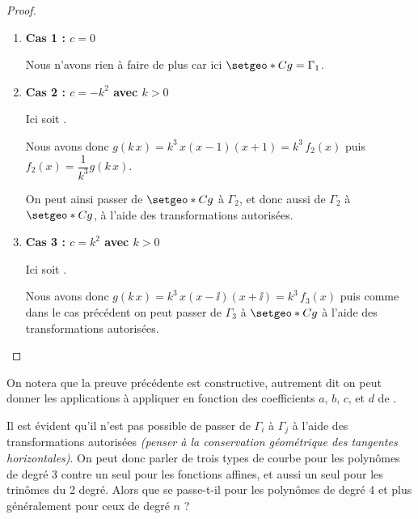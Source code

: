 \begin{proof}
\begin{enumerate}


		\item \textbf{Cas 1 : $c = 0$}

		      \smallskip

		      \noindent
		      Nous n'avons rien à faire de plus car ici $\setgeo*{C}{g} = \Gamma_1$.




		\item \textbf{Cas 2 : $c = - k^2$ avec $k > 0$}

		      \smallskip

		      \noindent
		      Ici
		      soit
		      .

		      \smallskip

		      \noindent
		      Nous avons donc $g(k \, x) = k^3 \, x(x - 1)(x + 1) = k^3 \, f_2(x)$
		      puis
		      $f_2(x) = \dfrac{1}{k^3} g(k \, x)$.

		      \smallskip

		      \noindent
		      On peut ainsi passer de $\setgeo*{C}{g}$ à $\Gamma_2$, et donc aussi de $\Gamma_2$ à $\setgeo*{C}{g}$, à l'aide des transformations autorisées.




		\item \textbf{Cas 3 : $c = k^2$ avec $k > 0$}

		      \smallskip

		      \noindent
		      Ici
		      soit
		      .

		      \smallskip

		      \noindent
		      Nous avons donc $g(k \, x) = k^3 \, x(x - \ii)(x + \ii) = k^3 \, f_3(x)$
		      puis comme dans le cas précédent on peut passer de $\Gamma_3$ à $\setgeo*{C}{g}$ à l'aide des transformations autorisées.
	\end{enumerate}
\end{proof}




On notera que la preuve précédente est constructive, autrement dit on peut donner les applications à appliquer en fonction des coefficients $a$, $b$, $c$, et $d$ de .




\medskip

Il est évident qu'il n'est pas possible de passer de $\Gamma_i$  à $\Gamma_j$ à l'aide des transformations autorisées \emph{(penser à la conservation géométrique des tangentes horizontales)}.
On peut donc parler de trois types de courbe pour les polynômes de degré 3 contre un seul pour les fonctions affines, et aussi un seul pour les trinômes du 2\ieme{} degré.
Alors que se passe-t-il pour les polynômes de degré 4 et plus généralement pour ceux de degré $n$ ?